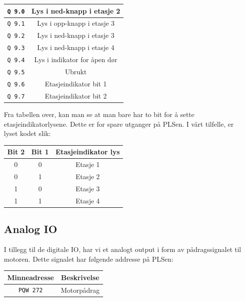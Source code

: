 \begin{alphasection}
\begin{center}
{\begin{tabular}{|c| c|}
 \verb|Q 9.0| & Lys i ned-knapp i etasje 2 \\ 
 \hline
 \verb|Q 9.1| &Lys i opp-knapp i etasje 3 \\ 
 \hline
 \verb|Q 9.2| & Lys i ned-knapp i etasje 3\\ 
 \hline
 \verb|Q 9.3| & Lys i ned-knapp i etasje 4\\ 
 \hline
 \verb|Q 9.4| & Lys i indikator for åpen dør \\ 
 \hline
 \verb|Q 9.5| &Ubrukt \\ 
 \hline
 \verb|Q 9.6| &Etasjeindikator bit 1 \\ 
 \hline
 \verb|Q 9.7| &Etasjeindikator bit 2 \\ 
 \toprule
\end{tabular}}
\end{center}

Fra tabellen over, kan man se at man bare har to bit for å sette etasjeindikatorlysene. Dette er for spare utganger på PLSen. I vårt tilfelle, er lyset kodet slik:

\begin{center}
 {\begin{tabular}{|c| c| c|} 
 \hline
 \textbf{Bit 2} & \textbf{Bit 1} & \textbf{Etasjeindikator lys} \\ 
 \toprule
 0 & 0 & Etasje 1 \\ 
 \hline
 0 & 1 & Etasje 2 \\
 \hline
 1 & 0 & Etasje 3 \\
 \hline
 1 & 1 & Etasje 4 \\
 \toprule
\end{tabular}}
\end{center}


\subsection{Analog IO}

I tillegg til de digitale IO, har vi et analogt output i form av pådragssignalet til motoren. Dette signalet har følgende addresse på PLSen:

\begin{center}
 {\begin{tabular}{|c| c|} 
 \hline
 \textbf{Minneadresse} & \textbf{Beskrivelse} \\ 
 \toprule
 \verb|PQW 272| & Motorpådrag \\ 
 \toprule
\end{tabular}}
\end{center}


\end{alphasection}
